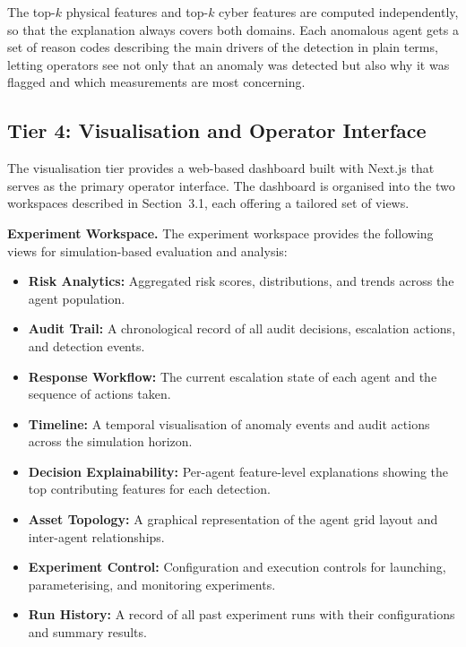 The top-$k$ physical features and top-$k$ cyber features are computed independently, so that the explanation always covers both domains. Each anomalous agent gets a set of reason codes describing the main drivers of the detection in plain terms, letting operators see not only that an anomaly was detected but also why it was flagged and which measurements are most concerning.

\subsection{Tier 4: Visualisation and Operator Interface}

The visualisation tier provides a web-based dashboard built with Next.js that serves as the primary operator interface. The dashboard is organised into the two workspaces described in Section~3.1, each offering a tailored set of views.

\par \vspace{0.35cm}
\textbf{Experiment Workspace.} The experiment workspace provides the following views for simulation-based evaluation and analysis:

\begin{itemize}
    \item \textbf{Risk Analytics:} Aggregated risk scores, distributions, and trends across the agent population.
    \item \textbf{Audit Trail:} A chronological record of all audit decisions, escalation actions, and detection events.
    \item \textbf{Response Workflow:} The current escalation state of each agent and the sequence of actions taken.
    \item \textbf{Timeline:} A temporal visualisation of anomaly events and audit actions across the simulation horizon.
    \item \textbf{Decision Explainability:} Per-agent feature-level explanations showing the top contributing features for each detection.
    \item \textbf{Asset Topology:} A graphical representation of the agent grid layout and inter-agent relationships.
    \item \textbf{Experiment Control:} Configuration and execution controls for launching, parameterising, and monitoring experiments.
    \item \textbf{Run History:} A record of all past experiment runs with their configurations and summary results.
\end{itemize}

